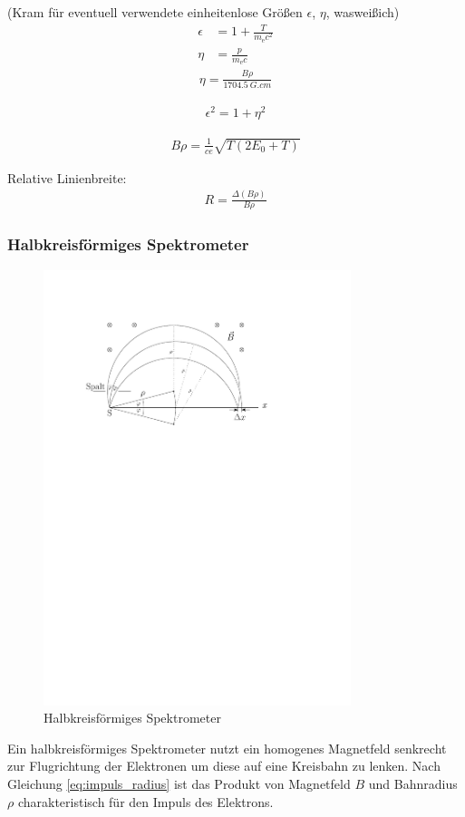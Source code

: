 \documentclass[11pt, a4paper]{article}
\numberwithin{equation}{section}
\begin{document}
(Kram für eventuell verwendete einheitenlose Größen $\epsilon$, $\eta$, wasweißich)
\begin{align}
	\epsilon &= 1 + \frac{T}{m_\mathrm{e} c^2} \\
	\eta &= \frac{p}{m_\mathrm{e} c}
\end{align}
\begin{align}
	\eta = \frac{B \rho}{\SI{1704.5}{G.cm}}
	\label{eq:brho_to_eta}
\end{align}

\begin{align}
	\epsilon^2 = 1 + \eta^2
	\label{eq:energie_impuls_rel}
\end{align}

\begin{align}
	B \rho = \frac{1}{c e} \sqrt{T \left( 2 E_0 + T \right)}
	\label{eq:b_rho}
\end{align}

Relative Linienbreite:
\begin{align}
	R = \frac{\Delta (B \rho)}{B \rho}
	\label{eq:rel_linienbreite}
\end{align}

\subsubsection{Halbkreisförmiges Spektrometer}
\begin{figure}[h]
	\centering
	\includegraphics[width=0.8\textwidth]{./figures/semicircular_spectrometer.pdf}
	\caption{Halbkreisförmiges Spektrometer}
	\label{fig:semicirc_spectro}
\end{figure}
Ein halbkreisförmiges Spektrometer nutzt ein homogenes Magnetfeld senkrecht zur Flugrichtung der Elektronen um diese auf eine Kreisbahn zu lenken.
Nach Gleichung \eqref{eq:impuls_radius} ist das Produkt von Magnetfeld $B$ und Bahnradius $\rho$ charakteristisch für den Impuls des Elektrons.
\end{document}
